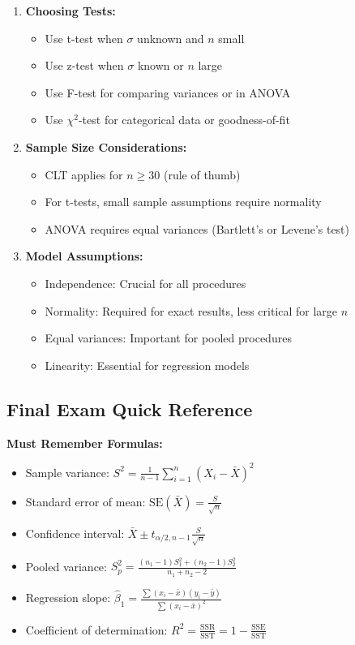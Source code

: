 \documentclass[12pt,a4paper]{amsart}
\theoremstyle{remark}
\begin{document}
\begin{enumerate}
\item \textbf{Choosing Tests:}
   \begin{itemize}
   \item Use t-test when $\sigma$ unknown and $n$ small
   \item Use z-test when $\sigma$ known or $n$ large
   \item Use F-test for comparing variances or in ANOVA
   \item Use $\chi^2$-test for categorical data or goodness-of-fit
   \end{itemize}

\item \textbf{Sample Size Considerations:}
   \begin{itemize}
   \item CLT applies for $n \geq 30$ (rule of thumb)
   \item For t-tests, small sample assumptions require normality
   \item ANOVA requires equal variances (Bartlett's or Levene's test)
   \end{itemize}

\item \textbf{Model Assumptions:}
   \begin{itemize}
   \item Independence: Crucial for all procedures
   \item Normality: Required for exact results, less critical for large $n$
   \item Equal variances: Important for pooled procedures
   \item Linearity: Essential for regression models
   \end{itemize}
\end{enumerate}

\subsection{Final Exam Quick Reference}

\textbf{Must Remember Formulas:}
\begin{itemize}
\item Sample variance: $S^2 = \frac{1}{n-1}\sum_{i=1}^n (X_i - \bar{X})^2$
\item Standard error of mean: $\text{SE}(\bar{X}) = \frac{S}{\sqrt{n}}$
\item Confidence interval: $\bar{X} \pm t_{\alpha/2, n-1} \frac{S}{\sqrt{n}}$
\item Pooled variance: $S_p^2 = \frac{(n_1-1)S_1^2 + (n_2-1)S_2^2}{n_1+n_2-2}$
\item Regression slope: $\hat{\beta}_1 = \frac{\sum(x_i-\bar{x})(y_i-\bar{y})}{\sum(x_i-\bar{x})^2}$
\item Coefficient of determination: $R^2 = \frac{\text{SSR}}{\text{SST}} = 1 - \frac{\text{SSE}}{\text{SST}}$
\end{itemize}
\end{document}
